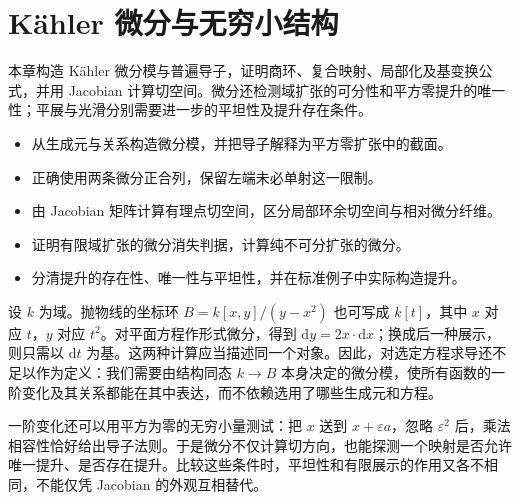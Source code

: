 
\chapter{Kähler 微分与无穷小结构}
\label{b3:ch:14}

\begin{chapterabstract}
	本章构造 Kähler 微分模与普遍导子，证明商环、复合映射、局部化及基变换公式，并用 Jacobian 计算切空间。微分还检测域扩张的可分性和平方零提升的唯一性；平展与光滑分别需要进一步的平坦性及提升存在条件。
\end{chapterabstract}

\begin{learninggoals}
	\begin{itemize}
		\item 从生成元与关系构造微分模，并把导子解释为平方零扩张中的截面。
		\item 正确使用两条微分正合列，保留左端未必单射这一限制。
		\item 由 Jacobian 矩阵计算有理点切空间，区分局部环余切空间与相对微分纤维。
		\item 证明有限域扩张的微分消失判据，计算纯不可分扩张的微分。
		\item 分清提升的存在性、唯一性与平坦性，并在标准例子中实际构造提升。
	\end{itemize}
\end{learninggoals}

设 \(k\) 为域。抛物线的坐标环 \(B=k[x,y]/(y-x^2)\) 也可写成 \(k[t]\)，其中 \(x\) 对应 \(t\)，\(y\) 对应 \(t^2\)。对平面方程作形式微分，得到 \(\mathrm{d}y=2x\cdot\mathrm{d}x\)；换成后一种展示，则只需以 \(\mathrm{d}t\) 为基。这两种计算应当描述同一个对象。因此，对选定方程求导还不足以作为定义：我们需要由结构同态 \(k\to B\) 本身决定的微分模，使所有函数的一阶变化及其关系都能在其中表达，而不依赖选用了哪些生成元和方程。

\ProseParagraphBreak

一阶变化还可以用平方为零的无穷小量测试：把 \(x\) 送到 \(x+\varepsilon a\)，忽略 \(\varepsilon^2\) 后，乘法相容性恰好给出导子法则。于是微分不仅计算切方向，也能探测一个映射是否允许唯一提升、是否存在提升。比较这些条件时，平坦性和有限展示的作用又各不相同，不能仅凭 Jacobian 的外观互相替代。

